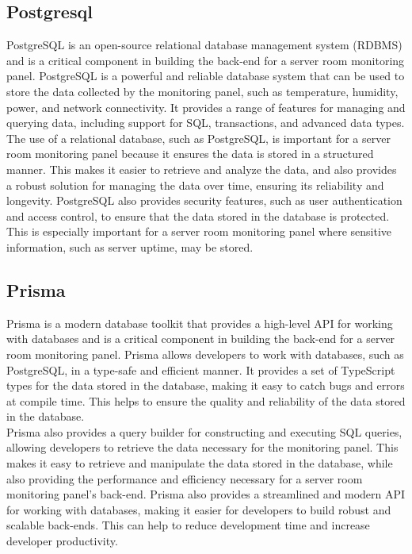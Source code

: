     \subsection{Postgresql}
    PostgreSQL is an open-source relational database management system (RDBMS) and is a critical component in building the back-end for a server room monitoring panel. PostgreSQL is a powerful and reliable database system that can be used to store the data collected by the monitoring panel, such as temperature, humidity, power, and network connectivity. It provides a range of features for managing and querying data, including support for SQL, transactions, and advanced data types.
    The use of a relational database, such as PostgreSQL, is important for a server room monitoring panel because it ensures the data is stored in a structured manner. This makes it easier to retrieve and analyze the data, and also provides a robust solution for managing the data over time, ensuring its reliability and longevity. PostgreSQL also provides security features, such as user authentication and access control, to ensure that the data stored in the database is protected. This is especially important for a server room monitoring panel where sensitive information, such as server uptime, may be stored.
    \subsection{Prisma} 
    Prisma is a modern database toolkit that provides a high-level API for working with databases and is a critical component in building the back-end for a server room monitoring panel. Prisma allows developers to work with databases, such as PostgreSQL, in a type-safe and efficient manner. It provides a set of TypeScript types for the data stored in the database, making it easy to catch bugs and errors at compile time. This helps to ensure the quality and reliability of the data stored in the database.\\
    Prisma also provides a query builder for constructing and executing SQL queries, allowing developers to retrieve the data necessary for the monitoring panel. This makes it easy to retrieve and manipulate the data stored in the database, while also providing the performance and efficiency necessary for a server room monitoring panel's back-end. Prisma also provides a streamlined and modern API for working with databases, making it easier for developers to build robust and scalable back-ends. This can help to reduce development time and increase developer productivity.
